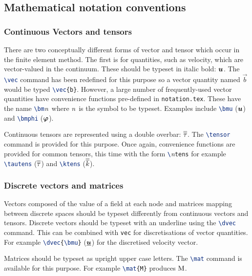\subsection{Mathematical notation conventions}

\subsubsection{Continuous Vectors and tensors}

There are two conceptually different forms of vector and tensor which occur
in the finite element method. The first is for quantities, such as velocity,
which are vector-valued in the continuum. These should be typeset in italic
bold: ${\mbox{\boldmath$u$}}$. The \lstinline[language=TeX]+\vec+ command has been redefined
for this purpose so a vector quantity named $\vec{b}$ would be typed
\lstinline[language=TeX]+\vec{b}+. However, a large number of
frequently-used vector quantities have convenience functions pre-defined in
\lstinline[language=bash]+notation.tex+. These have the name
\lstinline[language=TeX]+\bm+\textit{n}\ where \textit{n}\ is the symbol to
be typeset. Examples include \lstinline[language=TeX]+\bmu+ (${\mbox{\boldmath$u$}}$) and
\lstinline[language=TeX]+\bmphi+ (${\mbox{\boldmath$\varphi$}}$).

Continuous tensors are represented using a double overbar:
$\overline{\overline{\tau}}$. The \lstinline[language=TeX]+\tensor+ command is provided
for this purpose. Once again, convenience functions are provided for common
tensors, this time with the form
\lstinline[language=TeX]+\+\textit{n}\lstinline[language=TeX]+tens+ for
example \lstinline[language=TeX]+\tautens+ ($\overline{\overline{\tau}}$) and
\lstinline[language=TeX]+\ktens+ ($\overline{\overline{k}}$).

\subsubsection{Discrete vectors and matrices}

Vectors composed of the value of a field at each node and matrices mapping
between discrete spaces should be typeset differently from continuous
vectors and tensors. Discrete vectors should be typeset with an underline
using the \lstinline[language=TeX]+\dvec+ command. This can be combined with
\lstinline[language=TeX]+vec+ for discretisations of vector quantities. For
example \lstinline[language=TeX]+\dvec{\bmu}+ ($\underline{{\mbox{\boldmath$u$}}}$) for the
discretised velocity vector.

Matrices should be typeset as upright upper case letters. The
\lstinline[language=TeX]+\mat+ command is available for this purpose. For
example \lstinline[language=TeX]+\mat{M}+ produces $\mathrm{M}$.

